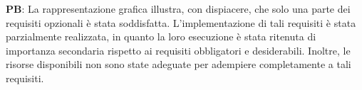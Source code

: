 \vspace{0.2cm}

\textbf{PB}: La rappresentazione grafica illustra, con dispiacere, che solo una parte dei requisiti opzionali è stata soddisfatta. L’implementazione di tali requisiti è stata parzialmente realizzata, in quanto la loro esecuzione è stata ritenuta di importanza secondaria rispetto ai requisiti obbligatori e desiderabili. Inoltre, le risorse disponibili non sono state adeguate per adempiere completamente a tali requisiti.